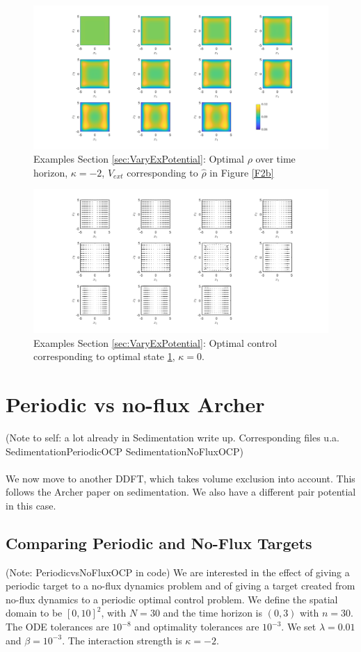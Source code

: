 \documentclass[11pt, a4paper]{article}
\theoremstyle{definition}
\newcommand{\hr}{\widehat \rho}
\begin{document}
\begin{figure}[h]
	\centering
	\includegraphics[scale=0.35]{rhoOptknV.png}
	\caption{Examples Section \ref{sec:VaryExPotential}: Optimal $\rho$ over time horizon, $\kappa = -2$, $V_{ext}$ corresponding to $\hr$ in Figure \ref{F2b}} 
	\label{F3e}
\end{figure}
\begin{figure}[h]
	\centering
	\includegraphics[scale=0.35]{ConOptknV.png}
	\caption{Examples Section \ref{sec:VaryExPotential}: Optimal control corresponding to optimal state \ref{F3e}, $\kappa = 0$.} 
	\label{F3f}
\end{figure}



\section{Periodic vs no-flux Archer}
(Note to self: a lot already in Sedimentation write up. Corresponding files u.a. SedimentationPeriodicOCP
SedimentationNoFluxOCP)\\
\\
We now move to another DDFT, which takes volume exclusion into account. This follows the Archer paper on sedimentation. We also have a different pair potential in this case.
\subsection{Comparing Periodic and No-Flux Targets} \label{sec:PeriodicNoFlux1}
(Note: PeriodicvsNoFluxOCP in code)
We are interested in the effect of giving a periodic target to a no-flux dynamics problem and of giving a target created from no-flux dynamics to a periodic optimal control problem. We define the spatial domain to be $[0,10]^2$, with $N = 30$ and the time horizon is $(0,3)$ with $n = 30$. The ODE tolerances are $10^{-8}$ and optimality tolerances are $10^{-3}$. We set $\lambda = 0.01$ and $\beta = 10^{-3}$. The interaction strength is $\kappa  = -2$.
\end{document}
